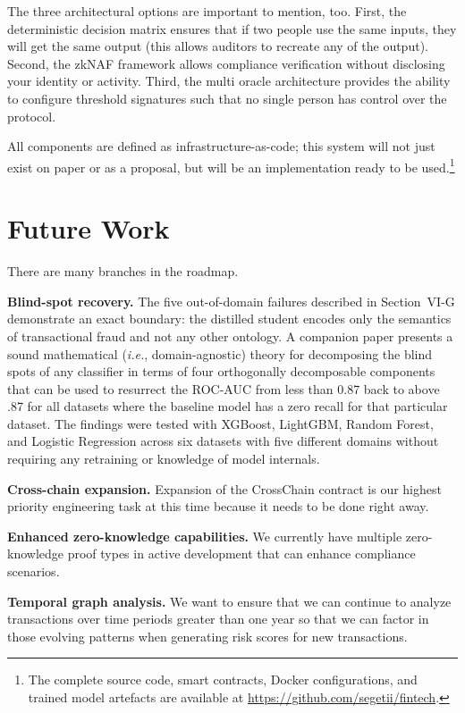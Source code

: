 \documentclass[journal]{IEEEtran}
\newcommand{\ie}{\textit{i.e.}}
\begin{document}
The three architectural options are important to mention, too. First, the deterministic decision matrix ensures that if two people use the same inputs, they will get the same output (this allows auditors to recreate any of the output). Second, the zkNAF framework allows compliance verification without disclosing your identity or activity. Third, the multi oracle architecture provides the ability to configure threshold signatures such that no single person has control over the protocol.

All components are defined as infrastructure-as-code; this system will not just exist on paper or as a proposal, but will be an implementation ready to be used.\footnote{The complete source code, smart contracts, Docker configurations, and trained model artefacts are available at \url{https://github.com/segetii/fintech}.}

\section{Future Work}
\label{sec:future}

There are many branches in the roadmap.

\textbf{Blind-spot recovery.} The five out-of-domain failures described in Section~VI-G demonstrate an exact boundary: the distilled student encodes only the semantics of transactional fraud and not any other ontology. A companion paper presents a sound mathematical (\ie, domain-agnostic) theory for decomposing the blind spots of any classifier in terms of four orthogonally decomposable components that can be used to resurrect the ROC-AUC from less than 0.87 back to above .87 for all datasets where the baseline model has a zero recall for that particular dataset. The findings were tested with XGBoost, LightGBM, Random Forest, and Logistic Regression across six datasets with five different domains without requiring any retraining or knowledge of model internals.

\textbf{Cross-chain expansion.} Expansion of the CrossChain contract is our highest priority engineering task at this time because it needs to be done right away.

\textbf{Enhanced zero-knowledge capabilities.} We currently have multiple zero-knowledge proof types in active development that can enhance compliance scenarios.

\textbf{Temporal graph analysis.} We want to ensure that we can continue to analyze transactions over time periods greater than one year so that we can factor in those evolving patterns when generating risk scores for new transactions.
\end{document}
